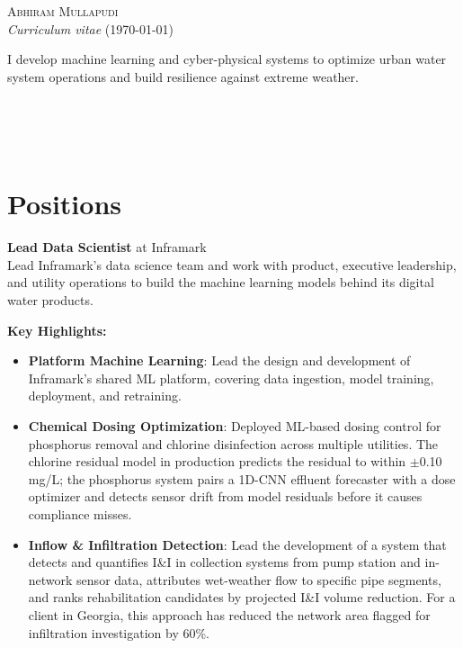 \documentclass[a4paper,11pt]{article}
\newcommand{\years}[1]{%
  {\reversemarginpar\strut\marginnote{{\small#1}}}%
}
\begin{document}
{\huge \textsc{Abhiram Mullapudi}}\\
{\small \textit{Curriculum vitae} (\today)}\\

\begin{vwcol}[widths={0.78,0.22}]
{\footnotesize I develop machine learning and cyber-physical systems to optimize urban water system operations and build resilience against extreme weather.}

\vfill\eject

{\scriptsize {\noindent
{\faEnvelope{}}\\
{\faHome{}}\\
{\faGithub{}}\\}}
\end{vwcol}

\vspace{-5mm}
\section*{Positions}

\years{2025--}%
\noindent\textbf{Lead Data Scientist} at Inframark\\[0.1cm]
Lead Inframark's data science team and work with product, executive leadership, and utility operations to build the machine learning models behind its digital water products.

\vspace{2mm}


{\small \textbf{Key Highlights:}}
\vspace{-2mm}
\begin{itemize}
	\setlength\itemsep{1mm}
	\item \textbf{Platform Machine Learning}: Lead the design and development of Inframark's shared ML platform, covering data ingestion, model training, deployment, and retraining.
	\item \textbf{Chemical Dosing Optimization}: Deployed ML-based dosing control for phosphorus removal and chlorine disinfection across multiple utilities. The chlorine residual model in production predicts the residual to within $\pm$0.10 mg/L; the phosphorus system pairs a 1D-CNN effluent forecaster with a dose optimizer and detects sensor drift from model residuals before it causes compliance misses.
	\item \textbf{Inflow \& Infiltration Detection}: Lead the development of a system that detects and quantifies I\&I in collection systems from pump station and in-network sensor data, attributes wet-weather flow to specific pipe segments, and ranks rehabilitation candidates by projected I\&I volume reduction. For a client in Georgia, this approach has reduced the network area flagged for infiltration investigation by 60\%.
\end{itemize}
\end{document}
